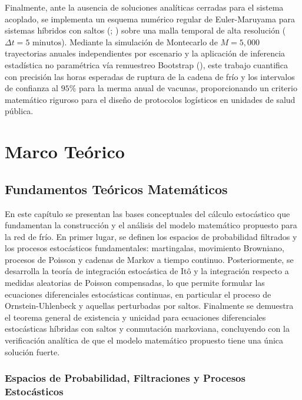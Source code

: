 \documentclass[
  spanish,
  letterpaper,
  DIV=11,
  numbers=noendperiod]{scrreprt}
\theoremstyle{plain}
\theoremstyle{plain}
\theoremstyle{plain}
\theoremstyle{definition}
\theoremstyle{remark}
\begin{document}
Finalmente, ante la ausencia de soluciones analíticas cerradas para el
sistema acoplado, se implementa un esquema numérico regular de
Euler-Maruyama para sistemas híbridos con saltos
(;
) sobre
una malla temporal de alta resolución (\(\Delta t = 5\text{ minutos}\)).
Mediante la simulación de Montecarlo de \(M = 5,000\) trayectorias
anuales independientes por escenario y la aplicación de inferencia
estadística no paramétrica vía remuestreo Bootstrap
(), este
trabajo cuantifica con precisión las horas esperadas de ruptura de la
cadena de frío y los intervalos de confianza al \(95\%\) para la merma
anual de vacunas, proporcionando un criterio matemático riguroso para el
diseño de protocolos logísticos en unidades de salud pública.

\part{Marco Teórico}

\chapter{Fundamentos Teóricos
Matemáticos}\label{fundamentos-teuxf3ricos-matemuxe1ticos}

En este capítulo se presentan las bases conceptuales del cálculo
estocástico que fundamentan la construcción y el análisis del modelo
matemático propuesto para la red de frío. En primer lugar, se definen
los espacios de probabilidad filtrados y los procesos estocásticos
fundamentales: martingalas, movimiento Browniano, procesos de Poisson y
cadenas de Markov a tiempo continuo. Posteriormente, se desarrolla la
teoría de integración estocástica de Itô y la integración respecto a
medidas aleatorias de Poisson compensadas, lo que permite formular las
ecuaciones diferenciales estocásticas continuas, en particular el
proceso de Ornstein-Uhlenbeck y aquellas perturbadas por saltos.
Finalmente se demuestra el teorema general de existencia y unicidad para
ecuaciones diferenciales estocásticas híbridas con saltos y conmutación
markoviana, concluyendo con la verificación analítica de que el modelo
matemático propuesto tiene una única solución fuerte.

\section{Espacios de Probabilidad, Filtraciones y Procesos
Estocásticos}\label{espacios-de-probabilidad-filtraciones-y-procesos-estocuxe1sticos}
\end{document}
